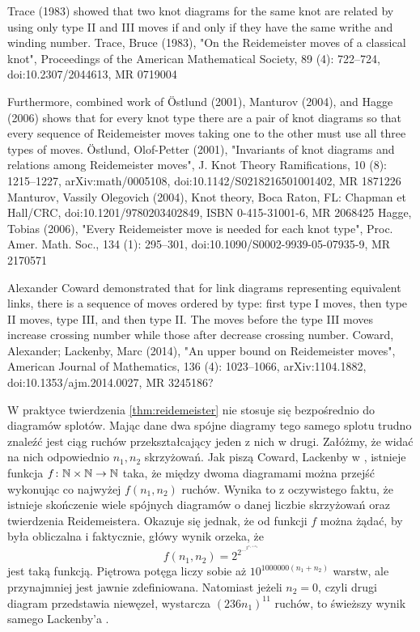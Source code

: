 \begin{tobedone}
    Trace (1983) showed that two knot diagrams for the same knot are related by using only type II and III moves if and only if they have the same writhe and winding number.
    Trace, Bruce (1983), "On the Reidemeister moves of a classical knot", Proceedings of the American Mathematical Society, 89 (4): 722–724, doi:10.2307/2044613, MR 0719004
\end{tobedone}

\begin{tobedone}
    Furthermore, combined work of Östlund (2001), Manturov (2004), and Hagge (2006) shows that for every knot type there are a pair of knot diagrams so that every sequence of Reidemeister moves taking one to the other must use all three types of moves.
    Östlund, Olof-Petter (2001), "Invariants of knot diagrams and relations among Reidemeister moves", J. Knot Theory Ramifications, 10 (8): 1215–1227, arXiv:math/0005108, doi:10.1142/S0218216501001402, MR 1871226
    Manturov, Vassily Olegovich (2004), Knot theory, Boca Raton, FL: Chapman et Hall/CRC, doi:10.1201/9780203402849, ISBN 0-415-31001-6, MR 2068425
    Hagge, Tobias (2006), "Every Reidemeister move is needed for each knot type", Proc. Amer. Math. Soc., 134 (1): 295–301, doi:10.1090/S0002-9939-05-07935-9, MR 2170571
\end{tobedone}

\begin{tobedone}
    Alexander Coward demonstrated that for link diagrams representing equivalent links, there is a sequence of moves ordered by type: first type I moves, then type II moves, type III, and then type II. The moves before the type III moves increase crossing number while those after decrease crossing number. 
    Coward, Alexander; Lackenby, Marc (2014), "An upper bound on Reidemeister moves", American Journal of Mathematics, 136 (4): 1023–1066, arXiv:1104.1882, doi:10.1353/ajm.2014.0027, MR 3245186?
\end{tobedone}

W praktyce twierdzenia \ref{thm:reidemeister} nie stosuje się bezpośrednio do diagramów splotów.
Mając dane dwa spójne diagramy tego samego splotu trudno znaleźć jest ciąg ruchów przekształcający jeden z nich w drugi.
Załóżmy, że widać na nich odpowiednio $n_1, n_2$ skrzyżowań.
Jak piszą Coward, Lackenby w \cite{coward11}, istnieje funkcja $f \colon \mathbb N \times \mathbb N \to \mathbb N$ taka, że między dwoma diagramami można przejść wykonując co najwyżej $f(n_1, n_2)$ ruchów.
Wynika to z oczywistego faktu, że istnieje skończenie wiele spójnych diagramów o danej liczbie skrzyżowań oraz twierdzenia Reidemeistera.
Okazuje się jednak, że od funkcji $f$ można żądać, by była obliczalna i faktycznie, główy wynik \cite{coward11} orzeka, że
\begin{equation}
	f(n_1, n_2) = 2^{2^{\ldots^{2^{n_1 + n_2}}}}
\end{equation}
jest taką funkcją.
Piętrowa potęga liczy sobie aż $10^{1000000 (n_1 + n_2)}$ warstw, ale przynajmniej jest jawnie zdefiniowana.
Natomiast jeżeli $n_2 = 0$, czyli drugi diagram przedstawia niewęzeł, wystarcza $(236n_1)^{11}$ ruchów, to świeższy wynik samego Lackenby'a \cite{lackenby15}.

